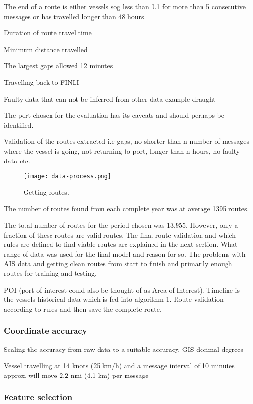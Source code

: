 \documentclass[../main.tex]{subfiles}
\begin{document}
The end of a route is either vessels sog less than 0.1 for more than 5 consecutive messages or has travelled longer than 48 hours

Duration of route travel time 

Minimum distance travelled

The largest gaps allowed 12 minutes

Travelling back to FINLI

Faulty data that can not be inferred from other data example draught

The port chosen for the evaluation has its caveats and should perhaps be identified.

Validation of the routes extracted i.e gaps, no shorter than n number of messages where the vessel is going, not returning to port, longer than n hours, no faulty data etc.

\begin{figure}[H]
	\centering
	\texttt{[image: data-process.png]}
	\caption{Getting routes.}
	\label{fig:flowchart}
\end{figure}

The number of routes found from each complete year was at average 1395 routes. 

The total number of routes for the period chosen was 13,955. However, only a fraction of these routes are valid routes. The final route validation and which rules are defined to find viable routes are explained in the next section.
What range of data was used for the final model and reason for so. The problems with AIS data and getting clean routes from start to finish and primarily enough routes for training and testing. 

POI (port of interest could also be thought of as Area of Interest). Timeline is the vessels historical data which is fed into algorithm 1. Route validation according to rules and then save the complete route.

\subsubsection{Coordinate accuracy}

Scaling the accuracy from raw data to a suitable accuracy. GIS decimal degrees

Vessel travelling at 14 knots (25 km/h) and a message interval of 10 minutes approx. will move 2.2 nmi (4.1 km) per message


\subsubsection{Feature selection}
\end{document}
